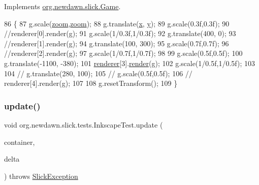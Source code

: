 Implements \mbox{\hyperlink{interfaceorg_1_1newdawn_1_1slick_1_1_game_af1a4670d43eb3ba04dfcf55ab1975b64}{org.\+newdawn.\+slick.\+Game}}.


\begin{DoxyCode}
86                                                                                   \{
87         g.scale(\mbox{\hyperlink{classorg_1_1newdawn_1_1slick_1_1tests_1_1_inkscape_test_ab12f97286b8d91a4a34120db6c223d73}{zoom}},\mbox{\hyperlink{classorg_1_1newdawn_1_1slick_1_1tests_1_1_inkscape_test_ab12f97286b8d91a4a34120db6c223d73}{zoom}});
88         g.translate(\mbox{\hyperlink{classorg_1_1newdawn_1_1slick_1_1tests_1_1_inkscape_test_ac1c5e9cb77532a2ac45acb0463eff275}{x}}, \mbox{\hyperlink{classorg_1_1newdawn_1_1slick_1_1tests_1_1_inkscape_test_a33b17405f7d73dabfaa62122e2a042c8}{y}});
89         g.scale(0.3f,0.3f);
90         \textcolor{comment}{//renderer[0].render(g);}
91         g.scale(1/0.3f,1/0.3f);
92         g.translate(400, 0);
93         \textcolor{comment}{//renderer[1].render(g);}
94         g.translate(100, 300);
95         g.scale(0.7f,0.7f);
96         \textcolor{comment}{//renderer[2].render(g);}
97         g.scale(1/0.7f,1/0.7f);
98         
99         g.scale(0.5f,0.5f);
100         g.translate(-1100, -380);
101         \mbox{\hyperlink{classorg_1_1newdawn_1_1slick_1_1tests_1_1_inkscape_test_ad55f8a6c6ee8f9f5b708e61240e4ce9a}{renderer}}[3].\mbox{\hyperlink{classorg_1_1newdawn_1_1slick_1_1svg_1_1_simple_diagram_renderer_a96e551c2437df27242c43353a85bd8ec}{render}}(g);
102         g.scale(1/0.5f,1/0.5f);
103         
104 \textcolor{comment}{//      g.translate(280, 100);}
105 \textcolor{comment}{//      g.scale(0.5f,0.5f);}
106 \textcolor{comment}{//      renderer[4].render(g);}
107         
108         g.resetTransform();
109     \}
\end{DoxyCode}
\mbox{\label{classorg_1_1newdawn_1_1slick_1_1tests_1_1_inkscape_test_ac8de6c02e969c4349f2b6b428d3f8630}} 
\subsubsection{\texorpdfstring{update()}{update()}}
{\footnotesize\ttfamily void org.\+newdawn.\+slick.\+tests.\+Inkscape\+Test.\+update (\begin{DoxyParamCaption}\item[{\mbox{\hyperlink{classorg_1_1newdawn_1_1slick_1_1_game_container}{Game\+Container}}}]{container,  }\item[{int}]{delta }\end{DoxyParamCaption}) throws \mbox{\hyperlink{classorg_1_1newdawn_1_1slick_1_1_slick_exception}{Slick\+Exception}}\hspace{0.3cm}{\ttfamily [inline]}}

